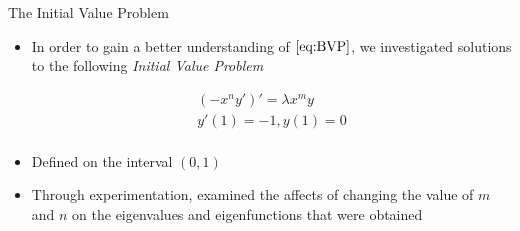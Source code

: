 \documentclass{beamer}
\begin{document}
\begin{frame}{The Initial Value Problem}

\vspace*{-20mm}

\begin{itemize}

\item In order to gain a better understanding of $\eqref{eq:BVP}$, we investigated solutions to the following \textit{Initial Value Problem}

\begin{center}

\begin{minipage}{5cm}

\begin{varblock}[5cm]

\begin{equation}
\begin{array}{l}
\displaystyle (-x^ny')'=\lambda x^my\\[2ex]
\displaystyle y'(1)=-1, y(1)=0 \\
\end{array} 
\label{eq:IVP}
\end{equation}

\end{varblock}

\end{minipage}

\end{center}

\end{itemize}

\begin{itemize}

\item Defined on the interval $(0,1)$

\item Through experimentation, examined the affects of changing the value of $m$ and $n$ on the eigenvalues and eigenfunctions that were obtained

\end{itemize}

\end{frame}
\end{document}
